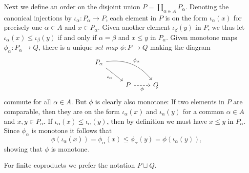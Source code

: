 \documentclass[article, a4paper, 11pt, oneside]{memoir}
\numberwithin{equation}{chapter}
\theoremstyle{nonumberplain}
\let\bigcoprod\coprod
\renewcommand{\coprod}{\sqcup}
\begin{document}
\begin{remarkbreak}
    Next we define an order on the disjoint union $P = \bigcoprod_{\alpha \in A} P_\alpha$. Denoting the canonical injections by $\iota_\alpha \colon P_\alpha \to P$, each element in $P$ is on the form $\iota_\alpha(x)$ for precisely one $\alpha \in A$ and $x \in P_\alpha$. Given another element $\iota_\beta(y)$ in $P$, we thus let $\iota_\alpha(x) \leq \iota_\beta(y)$ if and only if $\alpha = \beta$ and $x \leq y$ in $P_\alpha$. Given monotone maps $\phi_\alpha \colon P_\alpha \to Q$, there is a unique \emph{set map} $\phi \colon P \to Q$ making the diagram
    \begin{equation*}
        \begin{tikzcd}
            P_\alpha
                \ar[dr, "\iota_\alpha", swap]
                \ar[drr, "\phi_\alpha", bend left]
            \\
            & P
                \ar[r, "\phi", swap, dashed]
            & Q
        \end{tikzcd}
    \end{equation*}
    commute for all $\alpha \in A$. But $\phi$ is clearly also monotone: If two elements in $P$ are comparable, then they are on the form $\iota_\alpha(x)$ and $\iota_\alpha(y)$ for a common $\alpha \in A$ and $x,y \in P_\alpha$. If $\iota_\alpha(x) \leq \iota_\alpha(y)$, then by definition we must have $x \leq y$ in $P_\alpha$. Since $\phi_\alpha$ is monotone it follows that
    \begin{equation*}
        \phi(\iota_\alpha(x))
            = \phi_\alpha(x)
            \leq \phi_\alpha(y)
            = \phi(\iota_\alpha(y)),
    \end{equation*}
    showing that $\phi$ is monotone.

    For finite coproducts we prefer the notation $P \coprod Q$.
\end{remarkbreak}
\end{document}
